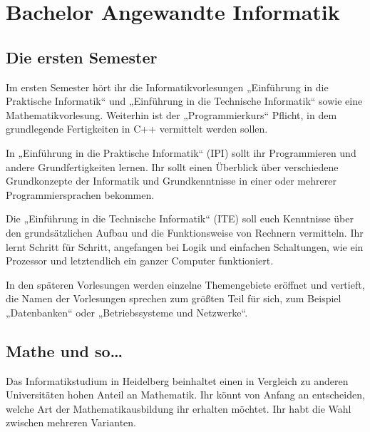 \section{Bachelor Angewandte Informatik}

\subsection{Die ersten Semester}

Im ersten Semester hört ihr die Informatikvorlesungen „Einführung in die Praktische Informatik“
und „Einführung in die Technische Informatik“ sowie eine Mathematikvorlesung.
Weiterhin ist der „Programmierkurs“ Pflicht, in dem grundlegende Fertigkeiten in C++ vermittelt werden
sollen.

In „Einführung in die Praktische Informatik“ (IPI) sollt ihr Programmieren
und andere Grundfertigkeiten lernen. Ihr sollt einen Überblick über verschiedene Grundkonzepte der
Informatik und Grundkenntnisse in einer oder mehrerer Programmiersprachen bekommen.

Die „Einführung in die Technische Informatik“ (ITE) soll euch Kenntnisse über den
grundsätzlichen Aufbau und die Funktionsweise von Rechnern vermitteln. Ihr lernt Schritt für Schritt,
angefangen bei Logik und einfachen Schaltungen, wie ein Prozessor und letztendlich ein ganzer Computer funktioniert.

In den späteren Vorlesungen werden einzelne Themengebiete eröffnet und vertieft, die Namen der
Vorlesungen sprechen zum größten Teil für sich, zum Beispiel „Datenbanken“ oder „Betriebssysteme
und Netzwerke“.


\subsection{Mathe und so\dots}

Das Informatikstudium in Heidelberg beinhaltet einen in Vergleich zu anderen Universitäten hohen
Anteil an Mathematik. Ihr könnt von Anfang an entscheiden, welche Art der Mathematikausbildung ihr
erhalten möchtet. Ihr habt die Wahl zwischen mehreren Varianten.

